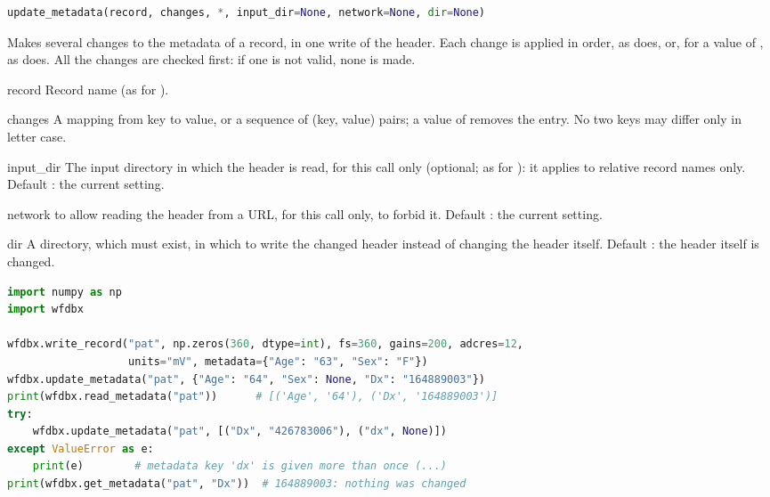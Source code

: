 \begin{lstlisting}[language=Python,style=signature]
update_metadata(record, changes, *, input_dir=None, network=None, dir=None)
\end{lstlisting}
Makes several changes to the metadata of a record, in one write of the header. Each
change is applied in order, as  does, or, for a value of
, as  does. All the changes are checked first: if one is
not valid, none is made.
\begin{params}
\item[record] Record name (as for ).
\item[changes] A mapping from key to value, or a sequence of (key, value) pairs; a value
  of  removes the entry. No two keys may differ only in letter case.
\item[input\_dir] The input directory in which the header is read, for this call only
  (optional; as for ): it applies to relative record names only.
  Default : the current setting.
\item[network]  to allow reading the header from a URL, for this call only,
   to forbid it. Default : the current setting.
\item[dir] A directory, which must exist, in which to write the changed header instead of
  changing the header itself. Default : the header itself is changed.
\end{params}
\begin{lstlisting}[language=Python,style=example]
import numpy as np
import wfdbx

wfdbx.write_record("pat", np.zeros(360, dtype=int), fs=360, gains=200, adcres=12,
                   units="mV", metadata={"Age": "63", "Sex": "F"})
wfdbx.update_metadata("pat", {"Age": "64", "Sex": None, "Dx": "164889003"})
print(wfdbx.read_metadata("pat"))      # [('Age', '64'), ('Dx', '164889003')]
try:
    wfdbx.update_metadata("pat", [("Dx", "426783006"), ("dx", None)])
except ValueError as e:
    print(e)        # metadata key 'dx' is given more than once (...)
print(wfdbx.get_metadata("pat", "Dx"))  # 164889003: nothing was changed
\end{lstlisting}

